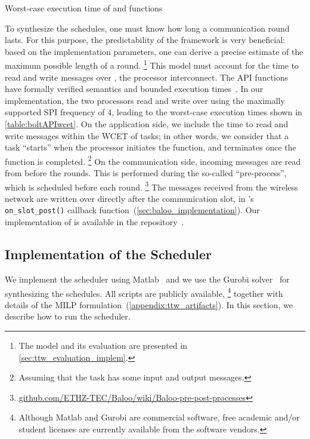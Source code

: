 \begin{table}
  \centering
  \caption{Worst-case execution time of \bolt \opread and \opwrite functions}
  \label{table:boltAPIwcet}
  {\smaller }
\end{table}


To synthesize the schedules, one must know how long a communication round lasts.
For this purpose, the predictability of the \baloo framework is very beneficial: based on the implementation parameters, one can derive a precise estimate of the maximum possible length of a round.%
%
\footnote{The \TTnet model and its evaluation are presented in \cref{sec:ttw_evaluation_implem}.\label{footnote:ttnet}}
%
This model must account for the time to read and write messages over \bolt, the \DPP processor interconnect.
The \bolt API functions have formally verified semantics and bounded execution times~\cite{sutton2015Bolt}.
In our implementation, the two processors read and write over \bolt using the maximally supported SPI frequency of 4\MHz, leading to the worst-case execution times shown in \cref{table:boltAPIwcet}.
On the application side, we include the time to read and write messages within the WCET of tasks; in other words, we consider that a task ``starts'' when the processor initiates the \bolt \opread function, and terminates once the \bolt \opwrite function is completed.%
%
\footnote{Assuming that the task has some input and output messages.}
%
On the communication side, incoming messages are read from \bolt before the rounds. This is performed during the so-called ``pre-process'', which is scheduled before each \baloo round.%
%
\footnote{\href{https://github.com/ETHZ-TEC/Baloo/wiki/Baloo-pre-post-processes}{github.com/ETHZ-TEC/Baloo/wiki/Baloo-pre-post-processes}}
%
The messages received from the wireless network are written over \bolt directly after the communication slot, in \baloo's \texttt{on\_slot\_post()} callback function~(\cref{sec:baloo_implementation}).
Our implementation of \TTnet is available in the \baloo repository~\cite{repoBaloo}.



\subsection{Implementation of the \TTW Scheduler}
\label{subsec:implem_sched}

We implement the \TTW scheduler using Matlab~\cite{Matlab} and we use the Gurobi solver~\cite{Gurobi} for synthesizing the schedules.
All scripts are publicly available,%
%
\footnote{Although Matlab and Gurobi are commercial software, free academic and/or student licenses are currently available from the software vendors.}
%
together with details of the MILP formulation~(\cref{appendix:ttw_artifacts}).
In this section, we describe how to run the \TTW scheduler.

